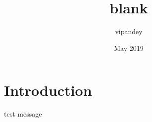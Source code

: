 \documentclass{article}
\title{blank}
\author{vipandey }
\date{May 2019}
\begin{document}
\maketitle

\section{Introduction}
test message
\end{document}
